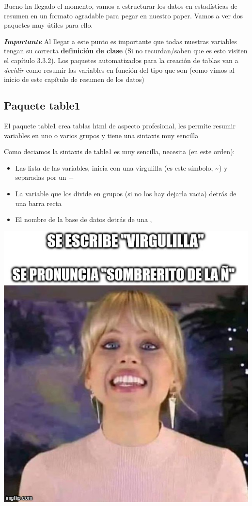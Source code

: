 \documentclass[
]{book}
\begin{document}
Bueno ha llegado el momento, vamos a estructurar los datos en estadísticas de resumen en un formato agradable para pegar en nuestro paper. Vamos a ver dos paquetes muy útiles para ello.

\textbf{\emph{Importante}}
Al llegar a este punto es importante que todas nuestras variables tengan su correcta \textbf{definición de clase} (Si no recurdan/saben que es esto visiten el capítulo 3.3.2). Los paquetes automatizados para la creación de tablas van a \emph{decidir} como resumir las variables en función del tipo que son (como vimos al inicio de este capítulo de resumen de los datos)

\hypertarget{paquete-table1}{%
\subsection{Paquete table1}\label{paquete-table1}}

El paquete table1 crea tablas html de aspecto profesional, les permite resumir variables en uno o varios grupos y tiene una sintaxis muy sencilla

Como deciamos la sintaxis de table1 es muy sencilla, necesita (en este orden):

\begin{itemize}
\item
  Las lista de las variables, inicia con una virgulilla (es este símbolo, \textasciitilde) y separadas por un +
\item
  La variable que los divide en grupos (si no los hay dejarla vacia) detrás de una barra recta \textbar{}
\item
  El nombre de la base de datos detrás de una ,
\end{itemize}

\includegraphics[width=6.94in]{img/virgu}
\end{document}
